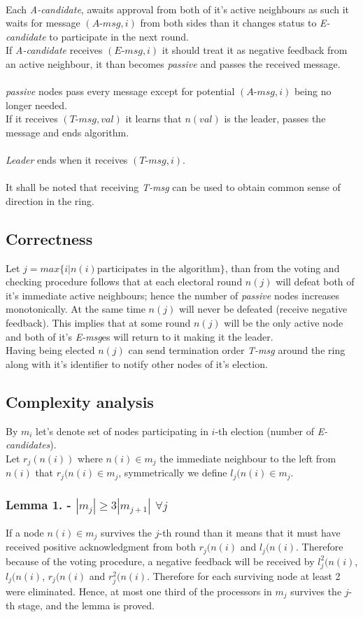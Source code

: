 \documentclass{article}
\begin{document}
\\
Each \textit{A-candidate}, awaits approval from both of it's active neighbours as such it waits for message $(\textit{A-msg},i)$ from both sides than it changes status to \textit{E-candidate} to participate in the next round.\\
If \textit{A-candidate} receives $(\textit{E-msg},i)$ it should treat it as negative feedback from an active neighbour, it than becomes \textit{passive} and passes the received message.\\
\\
\textit{passive} nodes pass every message except for potential $(\textit{A-msg},i)$ being no longer needed.\\
If it receives $(\textit{T-msg},val)$ it learns that $n(val)$ is the leader, passes the message and ends algorithm.\\
\\
\textit{Leader} ends when it receives $(\textit{T-msg},i)$.\\
\\
It shall be noted that receiving \textit{T-msg} can be used to obtain common sense of direction in the ring.
\newpage
\subsection*{Correctness}
Let $j=max\{i| n(i) \text{participates in the algorithm}\}$, than from the voting and checking procedure follows that at each electoral round $n(j)$ will defeat both of it's immediate active neighbours; hence the number of \textit{passive} nodes increases monotonically. At the same time $n(j)$ will never be defeated (receive negative feedback). This implies that at some round $n(j)$ will be the only active node and both of it's \textit{E-msg}es will return to it making it the leader.\\
Having being elected $n(j)$ can send termination order \textit{T-msg} around the ring along with it's identifier to notify other nodes of it's election.
\subsection*{Complexity analysis}
By $m_i$ let's denote set of nodes participating in $i$-th election (number of \textit{E-candidates}).\\
Let $r_j(n(i))$ where $n(i)\in m_j$ the immediate neighbour to the left from $n(i)$ that $r_j(n(i)\in m_j$, symmetrically we define $l_j(n(i)\in m_j$.
\subsubsection*{Lemma 1. - $|m_j|\geq 3|m_{j+1}|$ $\forall j$}
If a node $n(i)\in m_j$ survives the $j$-th round than it means that it must have received positive acknowledgment from both $r_j(n(i)$ and $l_j(n(i)$. Therefore because of the voting procedure, a negative feedback will be received by $l^{2}_{j}(n(i)$, $l_{j}(n(i)$, $r_{j}(n(i)$ and $r^{2}_{j}(n(i)$. Therefore for each surviving node at least 2 were eliminated. Hence, at most one third of the processors in $m_j$ survives the $j$-th stage, and the lemma is proved.
\end{document}
